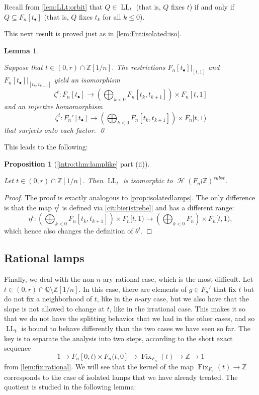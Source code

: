 \documentclass[reqno,12pt]{amsart}\setcounter{tocdepth}{1}
\newtheorem{lemma}[theorem]{Lemma}
\newtheorem{proposition}[theorem]{Proposition}
\theoremstyle{definition}
\newcommand{\Z}{\mathbb{Z}}
\newcommand{\Q}{\mathbb{Q}}
\DeclareMathOperator{\Fix}{Fix}
\DeclareMathOperator{\Hyp}{\mathcal{H}}
\DeclareMathOperator{\LL}{LL}
\numberwithin{equation}{section}
\begin{document}
Recall from \cref{lem:LLt:orbit} that $Q \in \LL_t$ (that is, $Q$ fixes $t$) if and only if $Q \subseteq F_n[t_\bullet]$ (that is, $Q$ fixes $t_k$ for all $k \leq 0$).

\medskip

This next result is proved just as in \cref{lem:Fnt:isolated:iso}.

\begin{lemma}
\label{lem:Fnt:iso}

Suppose that $t \in (0, r) \cap \Z[1/n]$. The restrictions $F_n[t_\bullet]|_{[t, 1]}$ and $F_n[t_\bullet]|_{[t_{k}, t_{k+1}]}$ yield an isomorphism
\[\zeta^t \colon F_n[t_\bullet] \to \left( \bigoplus_{k < 0} F_n[t_{k}, t_{k+1}] \right) \times F_n[t, 1]\]
and an injective homomorphism
\[\zeta^t \colon F_n'[t_\bullet] \to \left( \bigoplus_{k < 0} F_n[t_{k}, t_{k+1}] \right) \times F_n[t, 1)\]
that surjects onto each factor. \qed
\end{lemma}

This leads to the following:

\begin{proposition}[\cref{intro:thm:lamplike} part (ii)]
\label{prop:narylamps}

Let $t \in (0, r) \cap \Z[1/n]$. Then $\LL_t$ is isomorphic to $\Hyp(F_n \wr \Z)^{subst}$. 
\end{proposition}

\begin{proof} The proof is exactly analogous to \cref{prop:isolatedlamps}. The only difference is that the map $\eta^t$ is defined via \cref{cit:bieristrebel} and has a different range:
\[\eta^t \colon \left( \bigoplus_{k < 0} F_n[t_{k}, t_{k+1}] \right) \times F_n[t, 1) \to \left( \bigoplus_{k < 0} F_n \right) \times F_n[t, 1),\]
which hence also changes the definition of $\theta^t$.
\end{proof}



\subsection{Rational lamps}

Finally, we deal with the non-$n$-ary rational case, which is the most difficult. Let $t \in (0, r) \cap \Q \setminus \Z[1/n]$. In this case, there are elements of $g \in F_n'$ that fix $t$ but do not fix a neighborhood of $t$, like in the $n$-ary case, but we also have that the slope is not allowed to change at $t$, like in the irrational case. This makes it so that we do not have the splitting behavior that we had in the other cases, and so $\LL_t$ is bound to behave differently than the two cases we have seen so far. The key is to separate the analysis into two steps, according to the short exact sequence
\[1 \to F_n[0, t) \times F_n(t, 0] \to \Fix_{F_n}(t) \to \Z \to 1\]
from \cref{lem:fix:rational}. We will see that the kernel of the map $\Fix_{F_n}(t) \to \Z $ corresponds to the case of isolated lamps that we have already treated. The quotient is studied in the following lemma:
\end{document}
